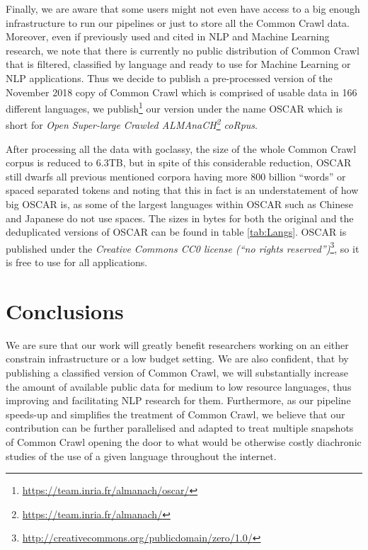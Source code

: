 \begin{table*}[t!]
{\begin{tabular}{@{}lrrrrclrrrr@{}}
            \bottomrule
        \end{tabular}
    }
    \caption{Size of the OSCAR corpus by language measured in bytes and number of words. Standard UNIX human-readable notation is used for the size in byte. We define ``words'' as spaced separated tokens, which gives a good estimate of the size of each corpus for languages using Latin or Cyrillic alphabets, but might give a misleading size for other languages such as Chinese or Japanese.}
    \label{tab:Langs}
\end{table*}

Finally, we are aware that some users might not even have access to a big enough infrastructure to run our pipelines or just to store all the Common Crawl data. Moreover, even if previously used and cited in NLP and Machine Learning research, we note that there is currently no public distribution of Common Crawl that is filtered, classified by language and ready to use for Machine Learning or NLP applications. Thus we decide to publish a pre-processed version of the November 2018 copy of Common Crawl which is comprised of usable data in 166 different languages, we publish\footnote{\url{https://team.inria.fr/almanach/oscar/}} our version under the name OSCAR which is short for \emph{Open Super-large Crawled ALMAnaCH\footnote{\url{https://team.inria.fr/almanach/}} coRpus}.

After processing all the data with goclassy, the size of the whole Common Crawl corpus is reduced to 6.3TB, but in spite of this considerable reduction, OSCAR still dwarfs all previous mentioned corpora having more 800 billion ``words'' or spaced separated tokens and noting that this in fact is an understatement of how big OSCAR is, as some of the largest languages within OSCAR such as Chinese and Japanese do not use spaces. The sizes in bytes for both the original and the deduplicated versions of OSCAR can be found in table \ref{tab:Langs}. OSCAR is published under the \emph{Creative Commons CC0 license (``no rights reserved'')}\footnote{\url{http://creativecommons.org/publicdomain/zero/1.0/}}, so it is free to use for all applications.

\section{Conclusions}

We are sure that our work will greatly benefit researchers working on an either constrain infrastructure or a low budget setting. We are also confident, that by publishing a classified version of Common Crawl, we will substantially increase the amount of available public data for medium to low resource languages, thus improving and facilitating NLP research for them. Furthermore, as our pipeline speeds-up and simplifies the treatment of Common Crawl, we believe that our contribution can be further parallelised and adapted to treat multiple snapshots of Common Crawl opening the door to what would be otherwise costly diachronic studies of the use of a given language throughout the internet.

